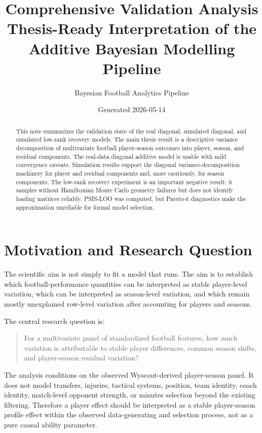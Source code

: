 \documentclass[11pt]{article}
\title{\textbf{Comprehensive Validation Analysis}\\
\large Thesis-Ready Interpretation of the Additive Bayesian Modelling Pipeline}
\author{Bayesian Football Analytics Pipeline}
\date{Generated 2026-05-14}
\begin{document}
\maketitle

\begin{abstract}
This note summarizes the validation state of the real diagonal, simulated
diagonal, and simulated low-rank recovery models. The main thesis result is a
descriptive variance decomposition of multivariate football player-season
outcomes into player, season, and residual components. The real-data diagonal
additive model is usable with mild convergence caveats. Simulation results
support the diagonal variance-decomposition machinery for player and residual
components and, more cautiously, for season components. The low-rank recovery
experiment is an important negative result: it samples without Hamiltonian
Monte Carlo geometry failures but does not identify loading matrices reliably.
PSIS-LOO was computed, but Pareto-\(k\) diagnostics make the approximation
unreliable for formal model selection.
\end{abstract}

\section{Motivation and Research Question}

The scientific aim is not simply to fit a model that runs. The aim is to
establish which football-performance quantities can be interpreted as stable
player-level variation, which can be interpreted as season-level variation, and
which remain mostly unexplained row-level variation after accounting for
players and seasons.

The central research question is:
\begin{quote}
For a multivariate panel of standardized football features, how much variation
is attributable to stable player differences, common season shifts, and
player-season residual variation?
\end{quote}

The analysis conditions on the observed Wyscout-derived player-season panel.
It does not model transfers, injuries, tactical systems, position, team
identity, coach identity, match-level opponent strength, or minutes selection
beyond the existing filtering. Therefore a player effect should be interpreted
as a stable player-season profile effect within the observed data-generating
and selection process, not as a pure causal ability parameter.
\end{document}
